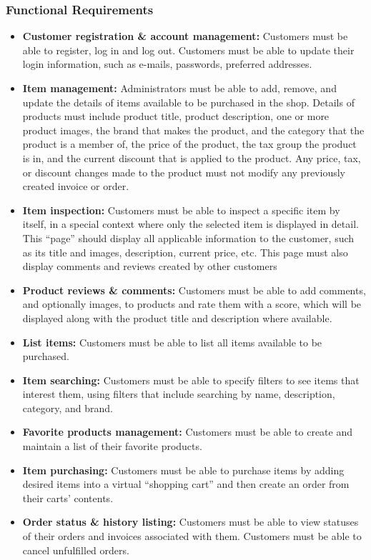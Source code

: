 \documentclass[a4paper,journal]{IEEEtran}
\begin{document}
\subsubsection{Functional Requirements}
\begin{itemize}
  \item \textbf{Customer registration \& account management:}
    Customers must be able to register, log in and log out. Customers
    must be able to update their login information, such as e-mails, passwords,
    preferred addresses.
  \item \textbf{Item management:} Administrators must be
    able to add, remove, and update the details of items available to be
    purchased in the shop. Details of products must include product title,
    product description, one or more product images, the brand that makes the
    product, and the category that the product is a member of, the price of the
    product, the tax
    group the product is in, and the current discount that is applied to the
    product. Any price, tax, or discount changes made to the product must not
    modify any previously created invoice or order.
  \item \textbf{Item inspection:} Customers must be able
    to inspect a specific item by itself, in a special context where only the
    selected item is displayed in detail. This ``page'' should display all applicable
    information to the customer, such as its title and images, description, current
    price, etc. This page must also display comments and reviews created by other
    customers
  \item \textbf{Product reviews \& comments:} Customers
    must be able to add comments, and optionally images, to products and rate them
    with a score, which will be displayed along with the product title and
    description where available.
  \item \textbf{List items:} Customers must be able to
   list all items available to be purchased.
  \item \textbf{Item searching:} Customers must be able to
    specify filters to see items that interest them, using filters that include
    searching by name, description, category, and brand.
  \item \textbf{Favorite products management:} Customers
   must be able to create and maintain a list of their favorite products.
  \item \textbf{Item purchasing:} Customers must be able
    to purchase items by adding desired items into a virtual ``shopping cart''
    and then create an order from their carts' contents.
  \item \textbf{Order status \& history listing:}
    Customers must be able to view statuses of
    their orders and invoices associated with them. Customers must be able to
    cancel unfulfilled orders.
\end{itemize}
\end{document}
